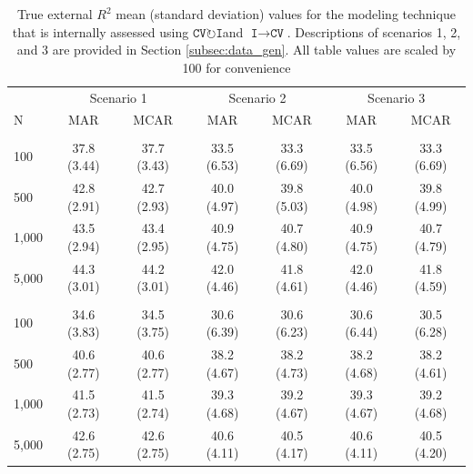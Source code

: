\documentclass[AMA,STIX1COL,doublespace]{WileyNJD-v2}
\begin{document}
\begin{table}

\caption{\label{tab:ext_rsq}True external $R^2$ mean (standard deviation) values for the modeling technique that is internally assessed using $\texttt{CV}\!\circlearrowright\!\texttt{I}$\space and $\texttt{I}\!\!\rightarrow\!\texttt{CV}$. Descriptions of scenarios 1, 2, and 3 are provided in Section \ref{subsec:data_gen}. All table values are scaled by 100 for convenience}
\centering
\begin{tabular}[t]{lcccccc}
\toprule
\multicolumn{1}{c}{ } & \multicolumn{2}{c}{Scenario 1} & \multicolumn{2}{c}{Scenario 2} & \multicolumn{2}{c}{Scenario 3} \\
\cmidrule(l{3pt}r{3pt}){2-3} \cmidrule(l{3pt}r{3pt}){4-5} \cmidrule(l{3pt}r{3pt}){6-7}
N & MAR & MCAR & MAR & MCAR & MAR & MCAR\\
\midrule
\addlinespace[0.75em]
\multicolumn{7}{l}{\textbf{10 predictors, 10 junk}}\\
\hline
\hspace{1em}100 & 37.8 (3.44) & 37.7 (3.43) & 33.5 (6.53) & 33.3 (6.69) & 33.5 (6.56) & 33.3 (6.69)\\
\hspace{1em}500 & 42.8 (2.91) & 42.7 (2.93) & 40.0 (4.97) & 39.8 (5.03) & 40.0 (4.98) & 39.8 (4.99)\\
\hspace{1em}1,000 & 43.5 (2.94) & 43.4 (2.95) & 40.9 (4.75) & 40.7 (4.80) & 40.9 (4.75) & 40.7 (4.79)\\
\hspace{1em}5,000 & 44.3 (3.01) & 44.2 (3.01) & 42.0 (4.46) & 41.8 (4.61) & 42.0 (4.46) & 41.8 (4.59)\\
\addlinespace[0.75em]
\multicolumn{7}{l}{\textbf{10 predictors, 40 junk}}\\
\hline
\hspace{1em}100 & 34.6 (3.83) & 34.5 (3.75) & 30.6 (6.39) & 30.6 (6.23) & 30.6 (6.44) & 30.5 (6.28)\\
\hspace{1em}500 & 40.6 (2.77) & 40.6 (2.77) & 38.2 (4.67) & 38.2 (4.73) & 38.2 (4.68) & 38.2 (4.61)\\
\hspace{1em}1,000 & 41.5 (2.73) & 41.5 (2.74) & 39.3 (4.68) & 39.2 (4.67) & 39.3 (4.67) & 39.2 (4.68)\\
\hspace{1em}5,000 & 42.6 (2.75) & 42.6 (2.75) & 40.6 (4.11) & 40.5 (4.17) & 40.6 (4.11) & 40.5 (4.20)\\

\end{tabular}
\end{table}
\end{document}
